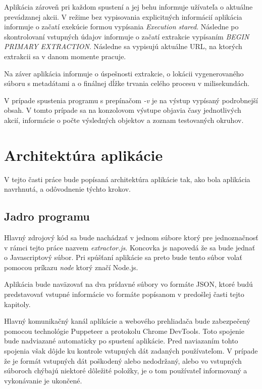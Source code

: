 Aplikácia zároveň pri každom spustení a jej behu informuje užívateľa o aktuálne prevádzanej akcii. V režime bez vypisovania explicitných informácií aplikácia informuje o začatí exekúcie formou vypísania \textit{Execution stared}. Následne po skontrolovaní vstupných údajov informuje o začatí extrakcie vypísaním \textit{BEGIN PRIMARY EXTRACTION}. Následne sa vypisujú aktuálne URL, na ktorých extrakcii sa v danom momente pracuje. 

Na záver aplikácia informuje o úspešnosti extrakcie, o lokácii vygenerovaného súboru s metadátami a o finálnej dĺžke trvania celého procesu v milisekundách.

V prípade spustenia programu s prepínačom \textit{-v} je na výstup vypísaný podrobnejší obsah. V tomto prípade sa na konzolovom výstupe objavia časy jednotlivých akcií, informácie o počte výsledných objektov a zoznam testovaných okruhov.

\section{Architektúra aplikácie}

V tejto časti práce bude popísaná architektúra aplikácie tak, ako bola aplikácia navrhnutá, a odôvodnenie týchto krokov. 

\subsection{Jadro programu}

Hlavný zdrojový kód sa bude nachádzať v jednom súbore ktorý pre jednoznačnosť v rámci tejto práce nazvem \textit{extractor.js}. Koncovka js napovedá že sa bude jednať o Javascriptový súbor. Pri spúšťaní aplikácie sa preto bude tento súbor volať pomocou príkazu \textit{node} ktorý značí Node.js.

Aplikácia bude naväzovať na dva prídavné súbory vo formáte JSON, ktoré budú predstavovať vstupné informácie vo formáte popísanom v predošlej časti tejto kapitoly. 

Hlavný komunikačný kanál aplikácie a webového prehliadača bude zabezpečený pomocou technológie Puppeteer a protokolu Chrome DevTools. Toto spojenie bude nadviazané automaticky po spustení aplikácie. Pred naviazaním tohto spojenia však dôjde ku kontrole vstupných dát zadaných používateľom. V prípade že je formát vstupných dát poškodený alebo nedodržaný, alebo vo vstupných súboroch chýbajú niektoré dôležité položky, je o tom používateľ informovaný a vykonávanie je ukončené.

